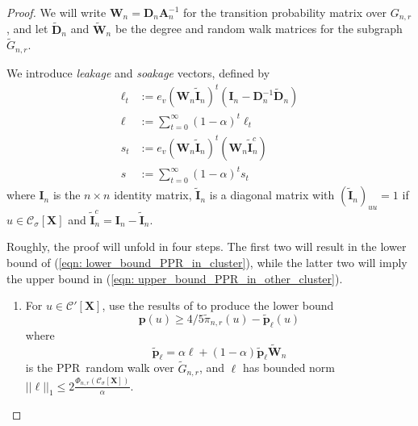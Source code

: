 \documentclass{article}
\newcommand{\1}{\mathbf{1}}
\newcommand{\pbf}{\mathbf{p}}
\newcommand{\Abf}{\mathbf{A}}
\newcommand{\Xbf}{\mathbf{X}}
\newcommand{\Wbf}{\mathbf{W}}
\newcommand{\Dbf}{\mathbf{D}}
\newcommand{\Cset}{\mathcal{C}}
\newcommand{\Csig}{\Cset_{\sigma}}
\newcommand{\pprspace}{{\sc PPR~}}
\newcommand{\wDbf}{\widetilde{\Dbf}}
\theoremstyle{aldenthm}
\begin{document}
\begin{proof}
	We will write $\Wbf_n = \Dbf_n \Abf_n^{-1}$ for the transition probability matrix over $G_{n,r}$, and let $\widetilde{\Dbf}_n$ and $\widetilde{\Wbf}_n$ be the degree and random walk matrices for the subgraph $\widetilde{G}_{n,r}$.
	
	We introduce \emph{leakage} and \emph{soakage} vectors, defined by
	\begin{align*}
	\ell_t & := e_v (\Wbf_n \widetilde{\mathbf{I}}_n )^t (\mathbf{I}_n - \Dbf_n^{-1} \wDbf_{n}) \\
	\ell & := \sum_{t = 0}^{\infty} (1 - \alpha)^t \ell_t \\
	s_t & := e_v (\Wbf_n \widetilde{\mathbf{I}}_n )^t (\Wbf_n \widetilde{\mathbf{I}}_n^c) \\
	s & := \sum_{t = 0}^{\infty} (1 - \alpha)^{t} s_t
	\end{align*}
	where $\mathbf{I}_n$ is the $n \times n$ identity matrix, $\widetilde{\mathbf{I}}_n$ is a diagonal matrix with $(\widetilde{\mathbf{I}}_n)_{uu} = 1$ if $u \in \Csig[\Xbf]$ and $\widetilde{\mathbf{I}}_n^c = \mathbf{I}_n - \widetilde{\mathbf{I}}_n$. 
	
	Roughly, the proof will unfold in four steps. The first two will result in the lower bound of (\ref{eqn: lower_bound_PPR_in_cluster}), while the latter two will imply the upper bound in (\ref{eqn: upper_bound_PPR_in_other_cluster}).
	
	\begin{enumerate}
		\item For $u \in \Cset'[\Xbf]$, use the results of \cite{zhu2013} to produce the lower bound 
		\begin{equation*}
		\pbf(u) \geq 4/5 \widetilde{\pi}_{n,r}(u) - \widetilde{\pbf}_{\ell}(u)
		\end{equation*}
		where 
		\begin{equation*}
		\widetilde{\pbf}_{\ell} = \alpha \ell + (1 - \alpha) \widetilde{\pbf}_{\ell} \widetilde{\Wbf}_n
		\end{equation*}
		is the \pprspace random walk over $\widetilde{G}_{n,r}$, and $\ell$ has bounded norm $||\ell||_1 \leq 2\frac{\Phi_{n,r}(\Csig[\Xbf])}{\alpha}$.
		

\end{enumerate}
\end{proof}
\end{document}
